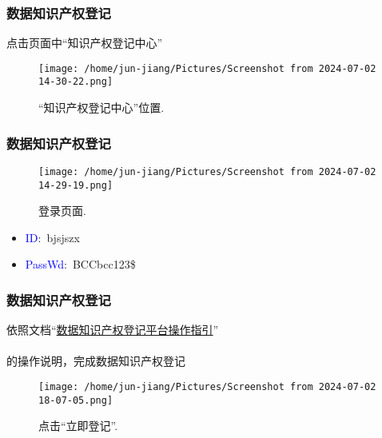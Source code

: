 \frame
{
	\frametitle{数据知识产权登记}
	点击页面中``知识产权登记中心''
\begin{figure}[h!]
\centering
\texttt{[image: /home/jun-jiang/Pictures/Screenshot from 2024-07-02 14-30-22.png]}
\caption{\tiny ``知识产权登记中心''位置.}%
\label{Data-Properties_Regist-Center}
\end{figure}
}

\frame
{
	\frametitle{数据知识产权登记}
\begin{figure}[h!]
\centering
\texttt{[image: /home/jun-jiang/Pictures/Screenshot from 2024-07-02 14-29-19.png]}
\caption{\tiny 登录页面.}%
\label{Data-Properties_Login}
\end{figure}
\vskip -0.15in
	\begin{itemize}
		\item \textrm{\textcolor{blue}{ID}:~bjsjszx}
		\item \textrm{\textcolor{blue}{PassWd}:~BCCbcc123\$}
	\end{itemize}
}

\frame
{
	\frametitle{数据知识产权登记}
	依照文档``\href{run:./数据知识产权登记平台操作指引0706.pdf}{数据知识产权登记平台操作指引}''\\{\fontsize{7.0pt}{5.2pt}}\\的操作说明，完成数据知识产权登记
\begin{figure}[h!]
\vskip -0.05in
\centering
\texttt{[image: /home/jun-jiang/Pictures/Screenshot from 2024-07-02 18-07-05.png]}
\caption{\tiny 点击``立即登记''.}%
\label{Data-Properties_Regist}
\end{figure}
}


